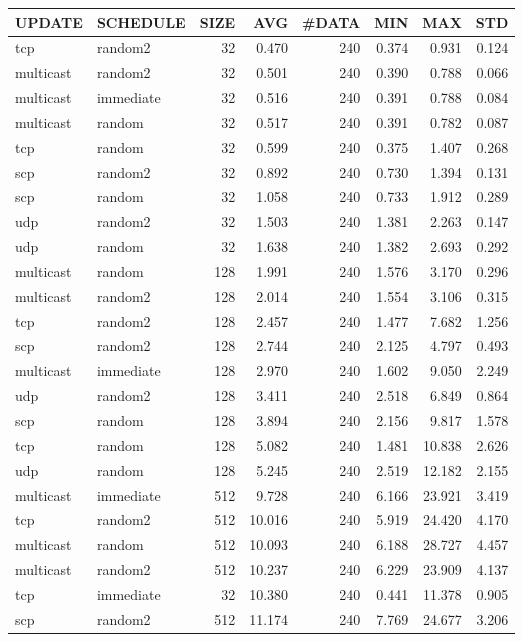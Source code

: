 \begin{tabular}{|l|l|r|r|r|r|r|r|}
\hline
UPDATE & SCHEDULE & SIZE & AVG & \#DATA & MIN & MAX & STD\\
\hline
tcp & random2 & 32 & 0.470 & 240 & 0.374 & 0.931 & 0.124\\
multicast & random2 & 32 & 0.501 & 240 & 0.390 & 0.788 & 0.066\\
multicast & immediate & 32 & 0.516 & 240 & 0.391 & 0.788 & 0.084\\
multicast & random & 32 & 0.517 & 240 & 0.391 & 0.782 & 0.087\\
tcp & random & 32 & 0.599 & 240 & 0.375 & 1.407 & 0.268\\
scp & random2 & 32 & 0.892 & 240 & 0.730 & 1.394 & 0.131\\
scp & random & 32 & 1.058 & 240 & 0.733 & 1.912 & 0.289\\
udp & random2 & 32 & 1.503 & 240 & 1.381 & 2.263 & 0.147\\
udp & random & 32 & 1.638 & 240 & 1.382 & 2.693 & 0.292\\
multicast & random & 128 & 1.991 & 240 & 1.576 & 3.170 & 0.296\\
multicast & random2 & 128 & 2.014 & 240 & 1.554 & 3.106 & 0.315\\
tcp & random2 & 128 & 2.457 & 240 & 1.477 & 7.682 & 1.256\\
scp & random2 & 128 & 2.744 & 240 & 2.125 & 4.797 & 0.493\\
multicast & immediate & 128 & 2.970 & 240 & 1.602 & 9.050 & 2.249\\
udp & random2 & 128 & 3.411 & 240 & 2.518 & 6.849 & 0.864\\
scp & random & 128 & 3.894 & 240 & 2.156 & 9.817 & 1.578\\
tcp & random & 128 & 5.082 & 240 & 1.481 & 10.838 & 2.626\\
udp & random & 128 & 5.245 & 240 & 2.519 & 12.182 & 2.155\\
multicast & immediate & 512 & 9.728 & 240 & 6.166 & 23.921 & 3.419\\
tcp & random2 & 512 & 10.016 & 240 & 5.919 & 24.420 & 4.170\\
multicast & random & 512 & 10.093 & 240 & 6.188 & 28.727 & 4.457\\
multicast & random2 & 512 & 10.237 & 240 & 6.229 & 23.909 & 4.137\\
tcp & immediate & 32 & 10.380 & 240 & 0.441 & 11.378 & 0.905\\
scp & random2 & 512 & 11.174 & 240 & 7.769 & 24.677 & 3.206\\

\end{tabular}
